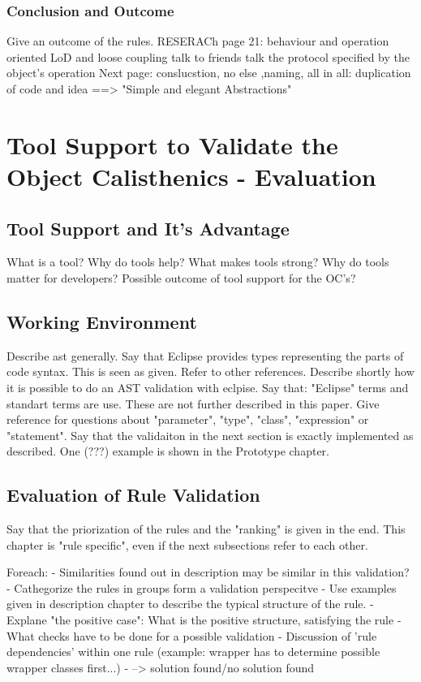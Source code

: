\subsection{Conclusion and Outcome}
Give an outcome of the rules. RESERACh page 21: 
behaviour and operation oriented
LoD and loose coupling
talk to friends
talk the protocol specified by the object's operation
Next page: conslucstion, no else ,naming, 
all in all: duplication of code and idea
==> "Simple and elegant Abstractions"



\chapter{Tool Support to Validate the Object Calisthenics - Evaluation}
\label{Evaluation}
\section{Tool Support and It's Advantage}
What is a tool? Why do tools help? What makes tools strong? Why do tools matter for developers?
Possible outcome of tool support for the OC's?
\section{Working Environment}
Describe ast generally. Say that Eclipse provides types representing the parts of code syntax. This is seen as given. 
Refer to other references.
Describe shortly how it is possible to do an AST validation with eclpise. Say that: "Eclipse" terms and standart terms are use. These are not further described in this paper. Give reference for questions about "parameter", "type", "class", "expression" or "statement".
Say that the validaiton in the next section is exactly implemented as described. One (???) example is shown in the Prototype chapter.
\section{Evaluation of Rule Validation}
Say that the priorization of the rules and the "ranking" is given in the end. This chapter is "rule specific", even if the next subsections refer to each other.

Foreach: 
 - Similarities found out in description may be similar in this validation?
 - Cathegorize the rules in groups form a validation perspecitve
 - Use examples given in description chapter to describe the typical structure of the rule. 
 - Explane "the positive case": What is the positive structure, satisfying the rule
 - What checks have to be done for a possible validation
 - Discussion of 'rule dependencies' within one rule (example: wrapper has to determine possible wrapper classes first...)
 - --> solution found/no solution found
 
